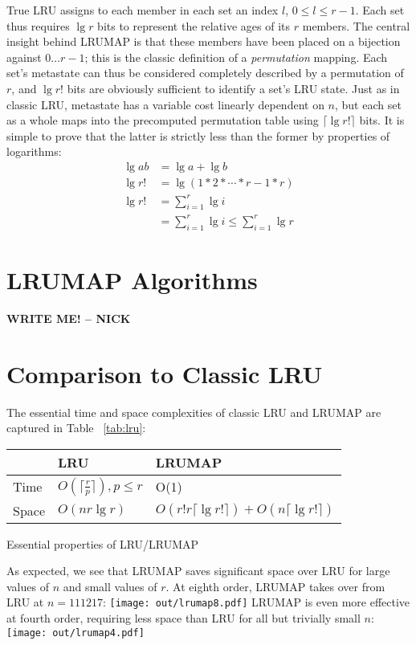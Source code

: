 \documentclass[letterpaper,10pt]{article}
\makeatletter
\newenvironment{tablehere}
{\def\@captype{table}}
{}
\newenvironment{figurehere}
{\def\@captype{figure}}
{}
\makeatother
\begin{document}
\begin{multicols}{2}
True LRU assigns to each member in each set an index $l$, $0\le{l}\le{r-1}$.
Each set thus requires $\lg{r}$ bits to represent the relative ages of its $r$
members. The central insight behind LRUMAP is that these members have been
placed on a bijection against $0\dotsc{r-1}$; this is the classic definition of
a \textit{permutation} mapping. Each set's metastate can thus be considered
completely described by a permutation of $r$, and $\lg{r!}$ bits are obviously
sufficient to identify a set's LRU state. Just as in classic LRU, metastate has
a variable cost linearly dependent on $n$, but each set as a whole maps into
the precomputed permutation table using $\lceil\lg{r!}\rceil$ bits. It is
simple to prove that the latter is strictly less than the former by properties
of logarithms:
\begin{align*}
\lg{ab} &= \lg{a} + \lg{b} \\
\lg{r!} &= \lg{(1*2*\dotsb*r-1*r)} \\
\lg{r!} &= \sum_{i=1}^{r}{\lg{i}} \\
&= \sum_{i=1}^{r}{\lg{i}} \le \sum_{i=1}^{r}{\lg{r}}
\end{align*}
\section{LRUMAP Algorithms}
\textbf{WRITE ME! -- NICK}
\section{Comparison to Classic LRU}
The essential time and space complexities of classic LRU and LRUMAP are
captured in Table ~\ref{tab:lru}:
\begin{center}
\begin{tablehere}
	\begin{tabular}{|l|l|l|}
	\hline
	& LRU & LRUMAP \\
	\hline
	Time & $O(\lceil\frac{r}{p}\rceil), {p}\le{r}$ & O(1) \\
	\hline
	Space & $O(nr\lg{r})$ & $O(r!r\lceil\lg{r!}\rceil) + O(n\lceil\lg{r!}\rceil)$ \\
	\hline
	\end{tabular}
	\caption{Essential properties of LRU/LRUMAP}
	\label{tab:lru}
\end{tablehere}
\end{center}
As expected, we see that LRUMAP saves significant space over LRU for large
values of $n$ and small values of $r$. At eighth order, LRUMAP takes over
from LRU at $n=111217$:
\begin{figurehere}
	\centering
	\texttt{[image: out/lrumap8.pdf]}
\end{figurehere}
LRUMAP is even more effective at fourth order, requiring less space than LRU
for all but trivially small $n$:
\begin{figurehere}
	\centering
	\texttt{[image: out/lrumap4.pdf]}
\end{figurehere}

\end{multicols}
\end{document}
